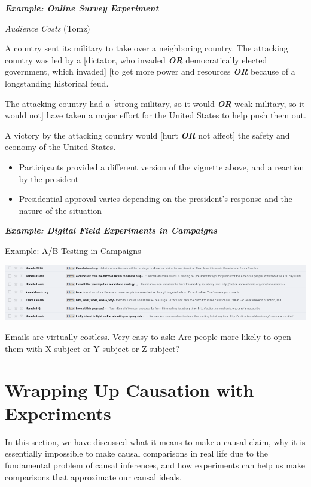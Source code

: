 \documentclass[
  letterpaper,
  DIV=11,
  numbers=noendperiod]{scrreprt}
\providecommand{\tightlist}{%
  \setlength{\itemsep}{0pt}\setlength{\parskip}{0pt}}\usepackage{longtable,booktabs,array}
\begin{document}
\textbf{\emph{Example: Online Survey Experiment}}

\emph{Audience Costs} (Tomz)

A country sent its military to take over a neighboring country. The
attacking country was led by a {[}dictator, who invaded
\textbf{\emph{OR}} democratically elected government, which invaded{]}
{[}to get more power and resources \textbf{\emph{OR}} because of a
longstanding historical feud.

The attacking country had a {[}strong military, so it would
\textbf{\emph{OR}} weak military, so it would not{]} have taken a major
effort for the United States to help push them out.

A victory by the attacking country would {[}hurt \textbf{\emph{OR}} not
affect{]} the safety and economy of the United States.

\begin{itemize}
\tightlist
\item
  Participants provided a different version of the vignette above, and a
  reaction by the president
\item
  Presidential approval varies depending on the president's response and
  the nature of the situation
\end{itemize}

\textbf{\emph{Example: Digital Field Experiments in Campaigns}}

Example: A/B Testing in Campaigns

\includegraphics{images/whichsubject.png}

Emails are virtually costless. Very easy to ask: Are people more likely
to open them with X subject or Y subject or Z subject?

\hypertarget{wrapping-up-causation-with-experiments}{%
\section{Wrapping Up Causation with
Experiments}\label{wrapping-up-causation-with-experiments}}

In this section, we have discussed what it means to make a causal claim,
why it is essentially impossible to make causal comparisons in real life
due to the fundamental problem of causal inferences, and how experiments
can help us make comparisons that approximate our causal ideals.
\end{document}
